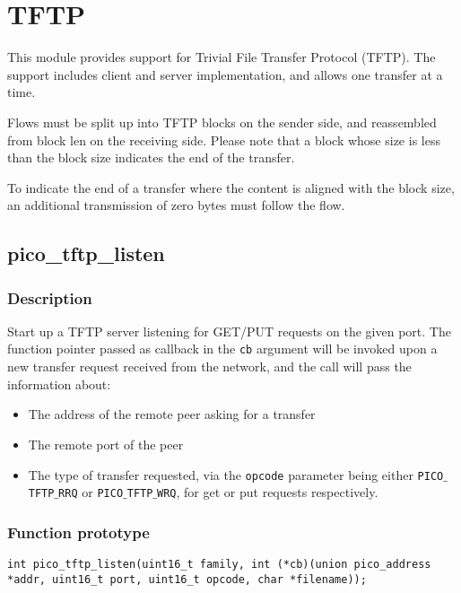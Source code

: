 \section{TFTP}

This module provides support for Trivial File Transfer Protocol (TFTP).
The support includes client and server implementation, and allows one transfer at a time.

Flows must be split up into TFTP blocks on the sender side, and reassembled from block len
on the receiving side. Please note that a block whose size is less than the block size indicates
the end of the transfer. 

To indicate the end of a transfer where the content is aligned with the block size, an additional  
transmission of zero bytes must follow the flow.


\subsection{pico\_tftp\_listen}

\subsubsection*{Description}
Start up a TFTP server listening for GET/PUT requests on the given port.
The function pointer passed as callback in the \texttt{cb} argument will be invoked upon a new
transfer request received from the network, and the call will pass the information about:
\begin{itemize}[noitemsep]
\item The address of the remote peer asking for a transfer
\item The remote port of the peer
\item The type of transfer requested, via the \texttt{opcode} parameter being either \texttt{PICO$\_$TFTP$\_$RRQ} or \texttt{PICO$\_$TFTP$\_$WRQ}, for get or put requests respectively.
\end{itemize}


\subsubsection*{Function prototype}
\begin{verbatim}
int pico_tftp_listen(uint16_t family, int (*cb)(union pico_address *addr, uint16_t port, uint16_t opcode, char *filename));
\end{verbatim}

